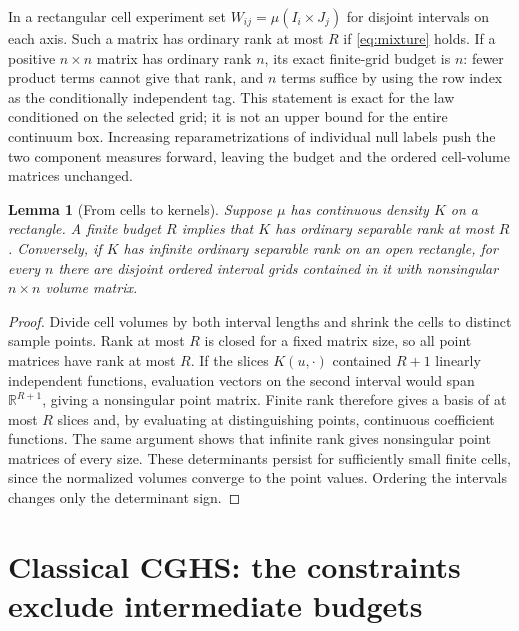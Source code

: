 \documentclass[11pt,letterpaper]{article}
\newtheorem{lemma}[theorem]{Lemma}
\begin{document}
In a rectangular cell experiment set $W_{ij}=\mu(I_i\times J_j)$ for disjoint intervals on each axis. Such a matrix has ordinary rank at most $R$ if \eqref{eq:mixture} holds. If a positive $n\times n$ matrix has ordinary rank $n$, its exact finite-grid budget is $n$: fewer product terms cannot give that rank, and $n$ terms suffice by using the row index as the conditionally independent tag. This statement is exact for the law conditioned on the selected grid; it is not an upper bound for the entire continuum box. Increasing reparametrizations of individual null labels push the two component measures forward, leaving the budget and the ordered cell-volume matrices unchanged.

\begin{lemma}[From cells to kernels]\label{lem:cells}
Suppose $\mu$ has continuous density $K$ on a rectangle. A finite budget $R$ implies that $K$ has ordinary separable rank at most $R$. Conversely, if $K$ has infinite ordinary separable rank on an open rectangle, for every $n$ there are disjoint ordered interval grids contained in it with nonsingular $n\times n$ volume matrix.
\end{lemma}
\begin{proof}
Divide cell volumes by both interval lengths and shrink the cells to distinct sample points. Rank at most $R$ is closed for a fixed matrix size, so all point matrices have rank at most $R$. If the slices $K(u,\cdot)$ contained $R+1$ linearly independent functions, evaluation vectors on the second interval would span $\mathbb R^{R+1}$, giving a nonsingular point matrix. Finite rank therefore gives a basis of at most $R$ slices and, by evaluating at distinguishing points, continuous coefficient functions. The same argument shows that infinite rank gives nonsingular point matrices of every size. These determinants persist for sufficiently small finite cells, since the normalized volumes converge to the point values. Ordering the intervals changes only the determinant sign.
\end{proof}

\section{Classical CGHS: the constraints exclude intermediate budgets}
\end{document}

